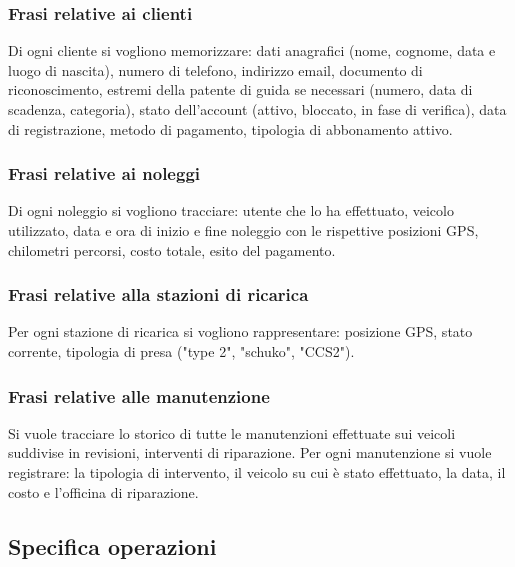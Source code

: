\documentclass{article}
\begin{document}
\subsubsection{Frasi relative ai clienti}
Di ogni cliente si vogliono memorizzare: dati anagrafici (nome, cognome, data e luogo di nascita), numero di telefono, indirizzo email, documento di riconoscimento, estremi della patente di guida se necessari (numero, data di scadenza, categoria),  stato dell'account (attivo, bloccato, in fase di verifica), data di registrazione, metodo di pagamento, tipologia di abbonamento attivo.

\subsubsection{Frasi relative ai noleggi}
Di ogni noleggio si vogliono tracciare: utente che lo ha effettuato, veicolo utilizzato, data e ora di inizio e fine noleggio con le rispettive posizioni GPS, chilometri percorsi, costo totale, esito del pagamento.

\subsubsection{Frasi relative alla stazioni di ricarica}
Per ogni stazione di ricarica si vogliono rappresentare: posizione GPS, stato corrente, tipologia di presa ("type 2", "schuko", "CCS2").

\subsubsection{Frasi relative alle manutenzione}
Si vuole tracciare lo storico di tutte le manutenzioni effettuate sui veicoli suddivise in revisioni, interventi di riparazione. Per ogni manutenzione si vuole registrare: la tipologia di intervento, il veicolo su cui è stato effettuato, la data, il costo e l'officina di riparazione.

\subsection{Specifica operazioni}
\end{document}
